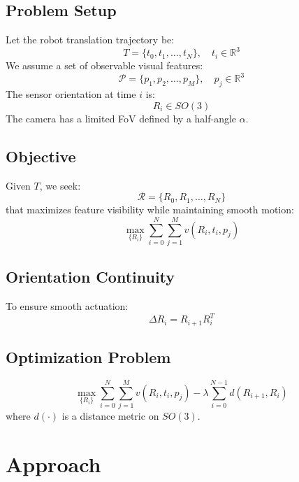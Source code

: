 \documentclass[letterpaper, 10 pt, conference]{ieeeconf}  %
\begin{document}
\subsection{Problem Setup}

Let the robot translation trajectory be:
\begin{equation}
T = \{t_0, t_1, \dots, t_N\}, \quad t_i \in \mathbb{R}^3
\end{equation}
We assume a set of observable visual features:
\begin{equation}
\mathcal{P} = \{p_1, p_2, \dots, p_M\}, \quad p_j \in \mathbb{R}^3
\end{equation}
The sensor orientation at time $i$ is:
\begin{equation}
R_i \in SO(3)
\end{equation}
The camera has a limited FoV defined by a half-angle $\alpha$.

\subsection{Objective}
Given $T$, we seek:
\begin{equation}
\mathcal{R} = \{R_0, R_1, \dots, R_N\}
\end{equation}
that maximizes feature visibility while maintaining smooth motion:
\begin{equation}
\max_{\{R_i\}} \sum_{i=0}^{N} \sum_{j=1}^{M} v(R_i, t_i, p_j)
\end{equation}

\subsection{Orientation Continuity}
To ensure smooth actuation:
\begin{equation}
\Delta R_i = R_{i+1} R_i^T
\end{equation}

\subsection{Optimization Problem}
\begin{equation}
\max_{\{R_i\}}
\sum_{i=0}^{N} \sum_{j=1}^{M} v(R_i, t_i, p_j)
-
\lambda \sum_{i=0}^{N-1} d(R_{i+1}, R_i)
\end{equation}
where $d(\cdot)$ is a distance metric on $SO(3)$.

\section{Approach}
\end{document}
